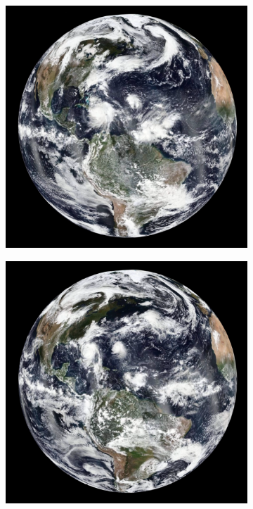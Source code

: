 \documentclass[journal]{vgtc}                %
\begin{document}
\begin{figure}[b]
    \centering
    \begin{subfigure}[tb]{0.32\linewidth}
    	\includegraphics[width=\textwidth]{earth_temporal/earth_temporal_viirs1.png}
	\end{subfigure}
    \begin{subfigure}[tb]{0.32\linewidth}
    	\includegraphics[width=\textwidth]{earth_temporal/earth_temporal_viirs2.png}

\end{subfigure}
\end{figure}
\end{document}
